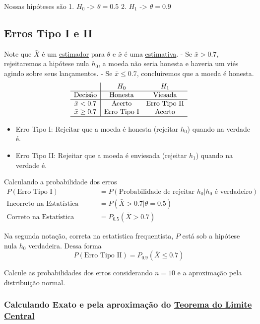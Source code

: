 \documentclass[
  letterpaper,
  DIV=11,
  numbers=noendperiod]{scrreprt}
\providecommand{\tightlist}{%
  \setlength{\itemsep}{0pt}\setlength{\parskip}{0pt}}\usepackage{longtable,booktabs,array}
\begin{document}
Nossas hipóteses são 1. \(H_{0}\) -\textgreater{} \(\theta = 0.5\) 2.
\(H_{1}\) -\textgreater{} \(\theta = 0.9\)

\subsection{Erros Tipo I e II}\label{erros-tipo-i-e-ii}

Note que \(\bar{X}\) é um \href{estimadores.qmd}{estimador} para
\(\theta\) e \(\bar{x}\) é uma \hyperref[estimativa]{estimativa}. - Se
\(\bar{x}>0.7\), rejeitaremos a hipótese nula \(h_{0}\), a moeda não
seria honesta e haveria um viés agindo sobre seus lançamentos. - Se
\(\bar{x}\leq 0.7\), concluiremos que a moeda é honesta. \[
\begin{array}{c|cc}
& H_{0} & H_{1} \\
\hline
\text{Decisão}  & \text{Honesta} & \text{Viesada}\\
\hline
\bar{x} < 0.7 & \text{Acerto} & \text{Erro Tipo II}\\
\bar{x} \geq 0.7& \text{Erro Tipo I} & \text{Acerto}\\
\hline
\end{array}
\]

\begin{itemize}
\tightlist
\item
  Erro Tipo I: Rejeitar que a moeda é honesta (rejeitar \(h_{0}\))
  quando na verdade é.
\item
  Erro Tipo II: Rejeitar que a moeda é enviesada (rejeitar \(h_{1}\))
  quando na verdade é.
\end{itemize}

Calculando a probabilidade dos erros \[
\begin{aligned}
P(\text{Erro Tipo I}) &= P(\text{Probabilidade de rejeitar $h_{0}$}|\text{$h_{0}$ é verdadeiro}) \\
\text{Incorreto na Estatística Clássica} &= P(\bar{X} > 0.7 | \theta = 0.5) \\
\text{Correto na Estatística Clássica} & = P_{0.5}(\bar{X} > 0.7)
\end{aligned}
\]

Na segunda notação, correta na estatística frequentista, \(P\) está sob
a hipótese nula \(h_{0}\) verdadeira. Dessa forma \[
P(\text{Erro Tipo II}) = P_{0.9}(\bar{X}\leq 0.7)
\]

Calcule as probabilidades dos erros considerando \(n=10\) e a
aproximação pela distribuição normal.

\subsubsection{\texorpdfstring{Calculando Exato e pela aproximação do
\href{tlc.qmd}{Teorema do Limite
Central}}{Calculando Exato e pela aproximação do Teorema do Limite Central}}\label{calculando-exato-e-pela-aproximauxe7uxe3o-do-teorema-do-limite-central}
\end{document}
